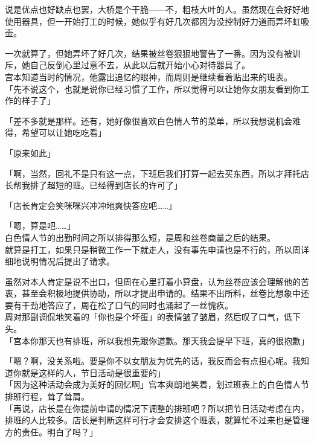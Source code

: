 说是优点也好缺点也罢，大桥是个干脆——不，粗枝大叶的人。虽然现在会好好地使用器具，但一开始打工的时候，她似乎有好几次都因为没控制好力道而弄坏虹吸壶。

一次就算了，但她弄坏了好几次，结果被丝卷狠狠地警告了一番。因为没有被训斥，她自己反倒心里过意不去，从此以后就开始小心对待器具了。\\

宫本知道当时的情况，他露出追忆的眼神，而周则是继续看着贴出来的班表。\\

「先不说这个，也就是说你已经习惯了工作，所以觉得可以让她你女朋友看到你工作的样子了」

「差不多就是那样。还有，她好像很喜欢白色情人节的菜单，所以我想说机会难得，希望可以让她吃吃看」

「原来如此」

「啊，当然，回礼不是只有这一点，下班后我们打算一起去买东西，所以才拜托店长帮我排了超短的班。已经得到店长的许可了」

「店长肯定会笑咪咪兴冲冲地爽快答应吧……」

「嗯，算是吧……」\\

白色情人节的出勤时间之所以排得那么短，是周和丝卷商量之后的结果。\\

就算是打工，如果只是稍微工作一下就走人，没有事先申请也是不行的，所以周详细地说明情况后提出了请求。

虽然对本人肯定是说不出口，但周在心里打着小算盘，认为丝卷应该会理解他的苦衷，甚至会积极地提供协助，所以才提出申请的。结果不出所料，丝卷比想象中还要有干劲地答应了，周在松了口气的同时也涌起了一丝愧疚。\\

周对那副调侃地笑着的「你也是个坏蛋」的表情皱了皱眉，然后叹了口气，低下头。\\

「宫本你那天也有排班，所以我想先跟你道歉。那天我会提早下班，真的很抱歉」

「嗯？啊，没关系啦。要是你不以女朋友为优先的话，我反而会有点担心呢。我知道你就是这样的人，节日活动是很重要的」\\

「因为这种活动会成为美好的回忆啊」宫本爽朗地笑着，划过班表上的白色情人节排班行程，耸了耸肩。\\

「再说，店长是在你提前申请的情况下调整的排班吧？所以把节日活动考虑在内，排班的人比较多。店长是判断这样可行才会安排这个班表，就算忙不过来也是管理方的责任。明白了吗？」

